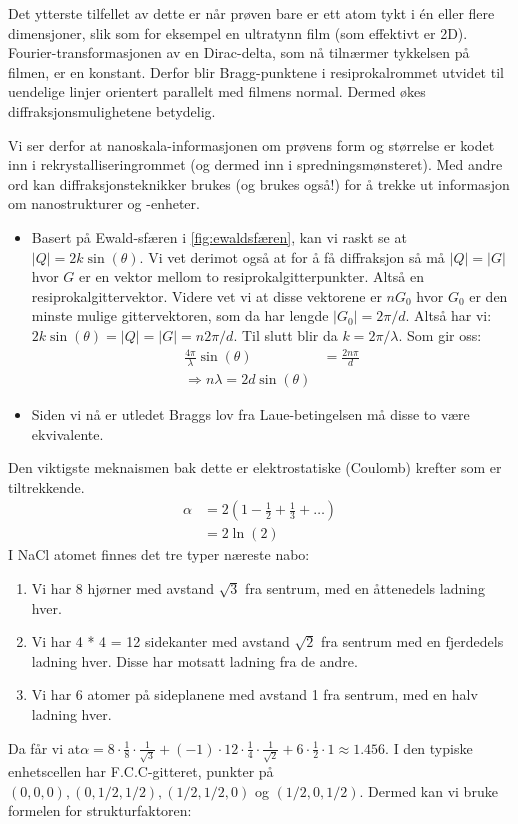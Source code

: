 \documentclass{article}
\begin{document}
Det ytterste tilfellet av dette er når prøven bare er ett atom tykt i én eller flere dimensjoner, slik som for eksempel en ultratynn film (som effektivt er 2D). Fourier-transformasjonen av en Dirac-delta, som nå tilnærmer tykkelsen på filmen, er en konstant. Derfor blir Bragg-punktene i resiprokalrommet utvidet til uendelige linjer orientert parallelt med filmens normal. Dermed økes diffraksjonsmulighetene betydelig.

Vi ser derfor at nanoskala-informasjonen om prøvens form og størrelse er kodet inn i rekrystalliseringrommet (og dermed inn i spredningsmønsteret). Med andre ord kan diffraksjonsteknikker brukes (og brukes også!) for å trekke ut informasjon om nanostrukturer og -enheter.

\begin{itemize}
    \item Basert på Ewald-sfæren i \ref{fig:ewaldsfæren}, kan vi raskt se at $|Q| = 2k \sin(\theta)$. Vi vet derimot også at for å få diffraksjon så må $|Q| = |G|$ hvor $G$ er en vektor mellom to resiprokalgitterpunkter. Altså en resiprokalgittervektor. Videre vet vi at disse vektorene er $n G_0$ hvor $G_0$ er den minste mulige gittervektoren, som da har lengde $|G_0| = 2 \pi / d$. Altså har vi: $ 2k \sin(\theta) = |Q| = |G| = n 2 \pi / d$. Til slutt blir da $k =2\pi / \lambda$. Som gir oss:
    \begin{align}
        \frac{4 \pi}{\lambda} \sin(\theta) &= \frac{2 n \pi}{d} \\
        \Rightarrow n \lambda = 2 d \sin(\theta)
    \end{align}
    \item Siden vi nå er utledet Braggs lov fra Laue-betingelsen må disse to være ekvivalente.
\end{itemize}
Den viktigste meknaismen bak dette er elektrostatiske (Coulomb) krefter som er tiltrekkende.
\begin{align}
    \alpha &= 2 (1 - \frac{1}{2} + \frac{1}{3} + \dots) \\
    &= 2\ln(2)
\end{align}
I NaCl atomet finnes det tre typer næreste nabo:
\begin{enumerate}
    \item Vi har 8 hjørner med avstand $\sqrt{3}$ fra sentrum, med en åttenedels ladning hver.
    \item Vi har 4 * 4 = 12 sidekanter med avstand $\sqrt{2}$ fra sentrum med en fjerdedels ladning hver. Disse har motsatt ladning fra de andre.
    \item Vi har 6 atomer på sideplanene med avstand 1 fra sentrum, med en halv ladning hver.
\end{enumerate}
Da får vi at$\alpha = 8\cdot\frac{1}{8} \cdot\frac{1}{\sqrt{3}} + 
 (-1) \cdot 12 \cdot \frac{1}{4}\cdot \frac{1}{\sqrt{2}} + 6 \cdot \frac{1}{2} \cdot 1 \approx 1.456 $.
I den typiske enhetscellen har F.C.C-gitteret, punkter på $(0,0,0), (0, 1/2, 1/2), (1/2, 1/2,0)$ og $(1/2, 0, 1/2)$. Dermed kan vi bruke formelen for strukturfaktoren:
\end{document}
